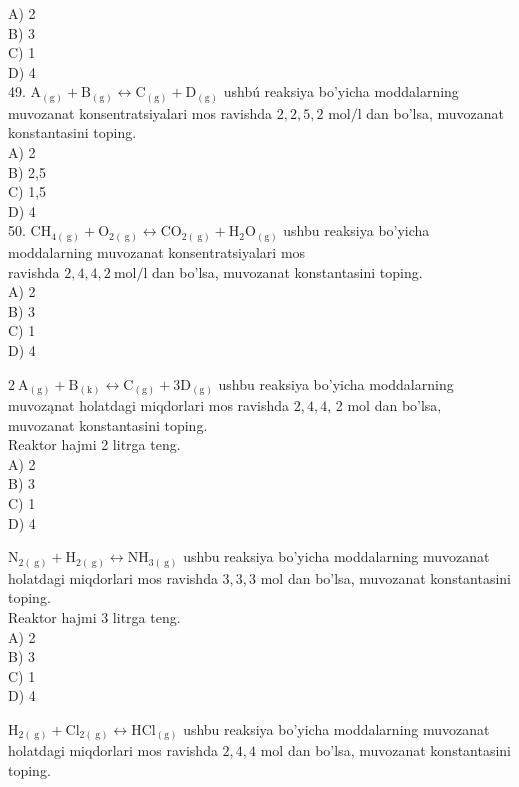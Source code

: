A) 2\\
B) 3\\
C) 1\\
D) 4\\
49. $\mathrm{A}_{(\mathrm{g})}+\mathrm{B}_{(\mathrm{g})} \leftrightarrow \mathrm{C}_{(\mathrm{g})}+\mathrm{D}_{(\mathrm{g})}$ ushbú reaksiya bo'yicha moddalarning muvozanat konsentratsiyalari mos ravishda $2,2,5,2$ $\mathrm{mol} / \mathrm{l}$ dan bo'lsa, muvozanat konstantasini toping.\\
A) 2\\
B) 2,5\\
C) 1,5\\
D) 4\\
50. $\mathrm{CH}_{4(\mathrm{~g})}+\mathrm{O}_{2(\mathrm{~g})} \leftrightarrow \mathrm{CO}_{2(\mathrm{~g})}+\mathrm{H}_{2} \mathrm{O}_{(\mathrm{g})}$ ushbu reaksiya bo'yicha moddalarning muvozanat konsentratsiyalari mos\\
ravishda $2,4,4,2 \mathrm{~mol} / \mathrm{l}$ dan bo'lsa, muvozanat konstantasini toping.\\
A) 2\\
B) 3\\
C) 1\\
D) 4
  \item $2 \mathrm{~A}_{(\mathrm{g})}+\mathrm{B}_{(\mathrm{k})} \leftrightarrow \mathrm{C}_{(\mathrm{g})}+3 \mathrm{D}_{(\mathrm{g})}$ ushbu reaksiya bo'yicha moddalarning muvoząnat holatdagi miqdorlari mos ravishda $2,4,4$, 2 mol dan bo'lsa, muvozanat konstantasini toping.\\ Reaktor hajmi 2 litrga teng.\\
A) 2\\
B) 3\\
C) 1\\
D) 4\\
  \item $\mathrm{N}_{2(\mathrm{~g})}+\mathrm{H}_{2(\mathrm{~g})} \leftrightarrow \mathrm{NH}_{3(\mathrm{~g})}$ ushbu reaksiya bo'yicha moddalarning muvozanat holatdagi miqdorlari mos ravishda $3,3,3$ mol dan bo'lsa, muvozanat konstantasini toping.\\Reaktor hajmi 3 litrga teng.\\
A) 2\\
B) 3\\
C) 1\\
D) 4
  \item $\mathrm{H}_{2(\mathrm{~g})}+\mathrm{Cl}_{2(\mathrm{~g})} \leftrightarrow \mathrm{HCl}_{(\mathrm{g})}$ ushbu reaksiya bo'yicha moddalarning muvozanat holatdagi miqdorlari mos ravishda $2,4,4$ mol dan bo'lsa, muvozanat konstantasini toping.\\
